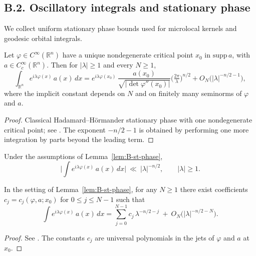 \bigskip
\subsection*{B.2. Oscillatory integrals and stationary phase}
\noindent We collect uniform stationary phase bounds used for microlocal kernels and geodesic orbital integrals.

\begin{lemma}\label{lem:B-st-phase}
Let \(\varphi\in C^\infty(\mathbb{R}^n)\) have a unique nondegenerate critical point \(x_0\) in \(\mathrm{supp}\,a\), with \(a\in C_c^\infty(\mathbb{R}^n)\). Then for \(|\lambda|\ge 1\) and every \(N\ge 1\),
\[
\int_{\mathbb{R}^n} e^{i\lambda \varphi(x)}\,a(x)\,dx
= e^{i\lambda \varphi(x_0)}\,\frac{a(x_0)}{\sqrt{|\det \varphi''(x_0)|}}\Big(\tfrac{2\pi}{\lambda}\Big)^{n/2}
+ O_{N}\!\big(|\lambda|^{-n/2-1}\big),
\]
where the implicit constant depends on \(N\) and on finitely many seminorms of \(\varphi\) and \(a\).
\end{lemma}

\begin{proof}
Classical Hadamard–Hörmander stationary phase with one nondegenerate critical point; see \cite[Thm.~7.7.5]{Hormander1983}. The exponent \(-n/2-1\) is obtained by performing one more integration by parts beyond the leading term.
\end{proof}

\begin{corollary}\label{cor:B-st-phase-unif}
Under the assumptions of Lemma~\ref{lem:B-st-phase},
\[
\Big|\int e^{i\lambda \varphi(x)}\,a(x)\,dx\Big|\ \ll\ |\lambda|^{-n/2},\qquad |\lambda|\ge 1.
\]
\end{corollary}

\begin{lemma}\label{lem:B-trunc-exp}
In the setting of Lemma~\ref{lem:B-st-phase}, for any \(N\ge 1\) there exist coefficients \(c_j=c_j(\varphi,a;x_0)\) for \(0\le j\le N-1\) such that
\[
\int e^{i\lambda \varphi(x)}\,a(x)\,dx
=\sum_{j=0}^{N-1} c_j\,\lambda^{-n/2-j}\ +\ O_N\!\big(|\lambda|^{-n/2-N}\big).
\]
\end{lemma}

\begin{proof}
See \cite[Chap.~7]{Hormander1983}. The constants \(c_j\) are universal polynomials in the jets of \(\varphi\) and \(a\) at \(x_0\).
\end{proof}

\bigskip
